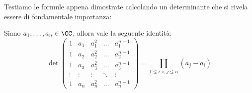 \documentclass[11pt]{scrartcl}
\begin{document}
   	 Testiamo le formule appena dimostrate calcolando un determinante che si rivela essere di fondamentale importanza:
   	 \begin{theorem}[Vandermonde]
   	 	Siano $a_1,\dots,a_n\in \CC$, allora vale la seguente identità:
   	 	$$\det\begin{pmatrix}
   	 		1 & a_1 & a_1^2 & \dots & a_1^{n-1} \\
   	 		1 & a_2 & a_2^2 & \dots & a_2^{n-1} \\
   	 		1 & a_3 & a_3^2 & \dots & a_3^{n-1} \\
   	 		\vdots & \vdots & \vdots & \ddots & \vdots \\
   	 		1 & a_n & a_n^2 & \dots & a_n^{n-1}
   	 	\end{pmatrix}= \prod_{1 \le i < j \le n}(a_j-a_i)$$  
   	 \end{theorem}
\end{document}
